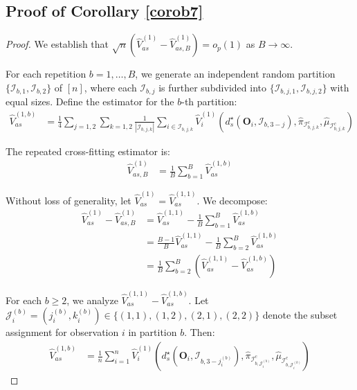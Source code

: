\documentclass[11pt]{article}
\theoremstyle{referenceplain}
\theoremstyle{referencedefinition}
\theoremstyle{referenceremark}
\begin{document}
\subsection{Proof of Corollary \ref{corob7}}
\begin{proof}
We establish that $\sqrt{n}(\widehat{V}_{as}^{(1)} - \widehat{V}_{as,B}^{(1)}) = o_p(1)$ as $B \to \infty$.

For each repetition $b = 1, \ldots, B$, we generate an independent random partition $\{\mathcal{I}_{b,1}, \mathcal{I}_{b,2}\}$ of $[n]$, where each $\mathcal{I}_{b,j}$ is further subdivided into $\{\mathcal{I}_{b,j,1}, \mathcal{I}_{b,j,2}\}$ with equal sizes. Define the estimator for the $b$-th partition:
\begin{align*}
    \widehat{V}_{as}^{(1,b)} &= \frac{1}{4}\sum_{j=1,2}\sum_{k=1,2}\frac{1}{|\mathcal{I}_{b,j,k}|}\sum_{i\in\mathcal{I}_{b,j,k}}\widehat{V}_i^{(1)}(d_s^\star(\mathbf{O}_i,\mathcal{I}_{b,3-j}),\widehat{\pi}_{\mathcal{I}_{b,j,k}^c},\widehat{\mu}_{\mathcal{I}_{b,j,k}^c})
\end{align*}

The repeated cross-fitting estimator is:
\begin{align*}
    \widehat{V}_{as,B}^{(1)} &= \frac{1}{B}\sum_{b=1}^B \widehat{V}_{as}^{(1,b)}
\end{align*}

Without loss of generality, let $\widehat{V}_{as}^{(1)} = \widehat{V}_{as}^{(1,1)}$. We decompose:
\begin{align*}
    \widehat{V}_{as}^{(1)} - \widehat{V}_{as,B}^{(1)} &= \widehat{V}_{as}^{(1,1)} - \frac{1}{B}\sum_{b=1}^B \widehat{V}_{as}^{(1,b)}\\
    &= \frac{B-1}{B}\widehat{V}_{as}^{(1,1)} - \frac{1}{B}\sum_{b=2}^B \widehat{V}_{as}^{(1,b)}\\
    &= \frac{1}{B}\sum_{b=2}^B (\widehat{V}_{as}^{(1,1)} - \widehat{V}_{as}^{(1,b)})
\end{align*}

For each $b \geq 2$, we analyze $\widehat{V}_{as}^{(1,1)} - \widehat{V}_{as}^{(1,b)}$. Let $\mathcal{J}_i^{(b)} = (j_i^{(b)}, k_i^{(b)}) \in \{(1,1), (1,2), (2,1), (2,2)\}$ denote the subset assignment for observation $i$ in partition $b$. Then:
\begin{align*}
    \widehat{V}_{as}^{(1,b)} &= \frac{1}{n}\sum_{i=1}^n \widehat{V}_i^{(1)}(d_s^\star(\mathbf{O}_i,\mathcal{I}_{b,3-j_i^{(b)}}),\widehat{\pi}_{\mathcal{I}_{b,\mathcal{J}_i^{(b)}}^c},\widehat{\mu}_{\mathcal{I}_{b,\mathcal{J}_i^{(b)}}^c})
\end{align*}


\end{proof}
\end{document}
